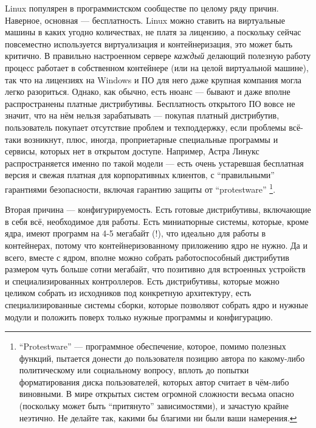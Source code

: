\documentclass{../../text-style}
\begin{document}
Linux популярен в программистском сообществе по целому ряду причин.
Наверное, основная --- бесплатность.
Linux можно ставить на виртуальные машины в каких угодно количествах, не платя за лицензию, а поскольку сейчас повсеместно используется виртуализация и контейнеризация, это может быть критично.
В правильно настроенном сервере \emph{каждый} делающий полезную работу процесс работает в собственном контейнере (или на целой виртуальной машине), так что на лицензиях на Windows и ПО для него даже крупная компания могла легко разориться.
Однако, как обычно, есть нюанс --- бывают и даже вполне распространены платные дистрибутивы.
Бесплатность открытого ПО вовсе не значит, что на нём нельзя зарабатывать --- покупая платный дистрибутив, пользователь покупает отсутствие проблем и техподдержку, если проблемы всё-таки возникнут, плюс, иногда, проприетарные специальные программы и сервисы, которых нет в открытом доступе.
Например, Астра Линукс распространяется именно по такой модели --- есть очень устаревшая бесплатная версия и свежая платная для корпоративных клиентов, с \enquote{правильными} гарантиями безопасности, включая гарантию защиты от \enquote{protestware}%
\footnote{\enquote{Protestware} --- программное обеспечение, которое, помимо полезных функций, пытается донести до пользователя позицию автора по какому-либо политическому или социальному вопросу, вплоть до попытки форматирования диска пользователей, которых автор считает в чём-либо виновными. В мире открытых систем огромной сложности весьма опасно (поскольку может быть \enquote{притянуто} зависимостями), и зачастую крайне неэтично. Не делайте так, какими бы благими ни были ваши намерения.}.

Вторая причина --- конфигурируемость.
Есть готовые дистрибутивы, включающие в себя всё, необходимое для работы.
Есть миниатюрные системы, которые, кроме ядра, имеют программ на 4-5 мегабайт (!), что идеально для работы в контейнерах, потому что контейнеризованному приложению ядро не нужно.
Да и всего, вместе с ядром, вполне можно собрать работоспособный дистрибутив размером чуть больше сотни мегабайт, что позитивно для встроенных устройств и специализированных контроллеров.
Есть дистрибутивы, которые можно целиком собрать из исходников под конкретную архитектуру, есть специализированные системы сборки, которые позволяют собрать ядро и нужные модули и положить поверх только нужные программы и конфигурацию.
\end{document}

